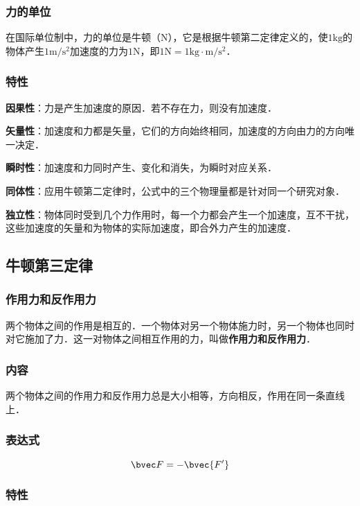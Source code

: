 \subsubsection{力的单位}
在国际单位制中，力的单位是牛顿（$\mathrm N$），它是根据牛顿第二定律定义的，使$1\mathrm{kg}$的物体产生$1\mathrm{m/s^2}$加速度的力为$1\mathrm N$，即$1\mathrm N=1\mathrm{kg \cdot m/s^2}$．

\subsubsection{特性}
\textbf{因果性}：力是产生加速度的原因．若不存在力，则没有加速度．

\textbf{矢量性}：加速度和力都是矢量，它们的方向始终相同，加速度的方向由力的方向唯一决定．

\textbf{瞬时性}：加速度和力同时产生、变化和消失，为瞬时对应关系．

\textbf{同体性}：应用牛顿第二定律时，公式中的三个物理量都是针对同一个研究对象．

\textbf{独立性}：物体同时受到几个力作用时，每一个力都会产生一个加速度，互不干扰，这些加速度的矢量和为物体的实际加速度，即合外力产生的加速度．

\subsection{牛顿第三定律}
\subsubsection{作用力和反作用力}
两个物体之间的作用是相互的．一个物体对另一个物体施力时，另一个物体也同时对它施加了力．这一对物体之间相互作用的力，叫做\textbf{作用力和反作用力}．

\subsubsection{内容}
两个物体之间的作用力和反作用力总是大小相等，方向相反，作用在同一条直线上．

\subsubsection{表达式}
\begin{equation}
\bvec F=-\bvec {F'}
\end{equation}

\subsubsection{特性}

